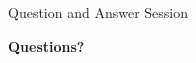 

\begin{frame}{Question and Answer Session}
    
    \large \centering \textbf{Questions? }
\end{frame}